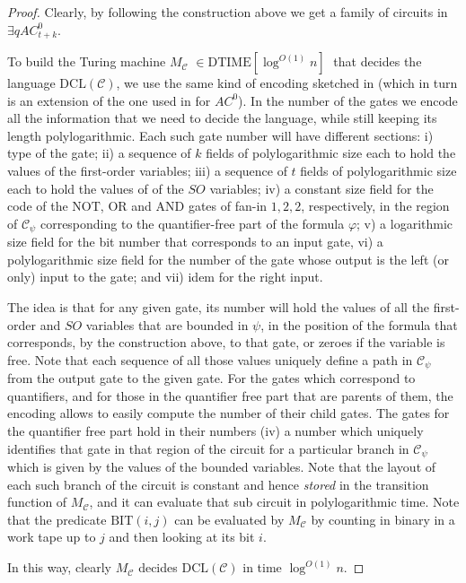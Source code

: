 \documentclass{article}
\begin{document}
\begin{proof}
Clearly, by following the construction above we get a family of circuits in $\exists qAC^0_{t+k}$.


To build the Turing machine $M_{\mathcal{C}}$ $\in\mathrm{DTIME} [\log^{O(1)} n]\;$ that decides the language $\mathrm{DCL}(\mathcal{C})$, we use the same kind of encoding sketched in \cite{Barr92} (which in turn is an extension of the one used in \cite{barrington:jcss1990} for $AC^{0}$).
In the number of the gates we encode all the information that we need to decide the language, while still keeping its length polylogarithmic.
Each such gate number will have different sections: i) type of the gate; ii) a sequence of $k$ fields of polylogarithmic size each to hold the values of the first-order variables; iii) a sequence of $t$ fields of polylogarithmic size each to hold the values of of the $SO$ variables; iv) a constant size field for the code of the $\mathrm{NOT}$, $\mathrm{OR}$ and $\mathrm{AND}$ gates of fan-in $1, 2, 2$, respectively, in the region of $\mathcal{C}_{\psi}$ corresponding to the quantifier-free part of the formula $\varphi$; v) a logarithmic size field for the bit number that corresponds to an input gate, vi) a polylogarithmic size field for the number of the gate whose output is the left (or only) input to the gate; and vii) idem for the right input.

The idea is that for any given gate, its number will hold the values of all the first-order and $SO$ variables that are bounded in ${\psi}$, in the position of the formula that corresponds, by the construction above, to that gate, or zeroes if the variable is free. Note that each sequence of all those values uniquely define a path in $\mathcal{C}_{\psi}$ from the output gate to the given gate. For the gates which correspond to quantifiers, and for those in the quantifier free part that are parents of them, the encoding allows to easily compute the number of their child gates.
The gates for the quantifier free part hold in their numbers (iv) a number which uniquely identifies that gate in that region of the circuit for a particular branch in $\mathcal{C}_{\psi}$ which is given by the values of the bounded variables. Note that the layout of each such branch of the circuit is constant and hence \textit{stored} in the transition function of $M_{\mathcal{C}}$, and it can evaluate that sub circuit in polylogarithmic time.
Note that the predicate $\mathrm{BIT}(i,j)$ can be evaluated by $M_{\mathcal{C}}$ by counting in binary in a work tape up to $j$ and then looking at its bit $i$.

In this way, clearly $M_{\mathcal{C}}$ decides $\mathrm{DCL}(\mathcal{C})$ in time $\log^{O(1)} n$. 
\end{proof}
\end{document}
